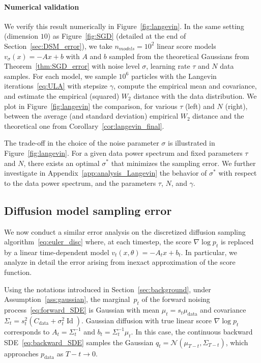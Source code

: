 \documentclass[11pt]{article}
\newcommand{\id}{\operatorname{Id}}
\begin{document}
\paragraph{Numerical validation} We verify this result numerically in Figure~\ref{fig:langevin}. In the same setting (dimension $10$) as Figure~\ref{fig:SGD} (detailed at the end of Section~\ref{sec:DSM_error}), we take $n_{models} = 10^2$ linear score models $v_\sigma(x) = -A x +b$ with $A$ and $b$ sampled from the theoretical Gaussians from Theorem~\ref{thm:SGD_error} with noise level $\sigma$, learning rate $\tau$ and $N$ data samples. For each model, we sample $10^6$ particles with the Langevin iterations~\eqref{eq:ULA} with stepsize $\gamma$, compute the empirical mean and covariance, and estimate the empirical (squared) $W_2$ distance with the data distribution. We plot in Figure~\ref{fig:langevin} the comparison, for various $\tau$ (left) and $N$ (right), between the average (and standard deviation) empirical $W_2$ distance and the theoretical one from Corollary~\ref{cor:langevin_final}. 

The trade-off in the choice of the noise parameter $\sigma$ is illustrated in Figure~\ref{fig:langevin}. For a given data power spectrum and fixed parameters \(\tau\) and \(N\), there exists an optimal \(\sigma^*\) that minimizes the sampling error. We further  investigate in Appendix~\ref{app:analysis_Langevin} the behavior of \(\sigma^*\) with respect to the data power spectrum, and the parameters $\tau$, $N$, and $\gamma$.
  


\subsection{Diffusion model sampling error}
\label{sec:diffusion}

We now conduct a similar error analysis on the discretized diffusion sampling algorithm~\eqref{eq:euler_disc} where, at each timestep, the score $\nabla \log p_{t}$ is replaced by a linear time-dependent model ${v_{t}(x, \theta) = - A_{t}x + b_{t}}$. In particular, we analyze in detail the error arising from inexact approximation of the score function.

Using the notations introduced in Section~\ref{sec:background}, under Assumption~\ref{ass:gaussian}, the marginal~$p_t$ of the forward noising process~\eqref{eq:forward_SDE} is Gaussian with mean $\mu_t = s_t \mu_{\mathrm{data}}$ and covariance $\Sigma_t = s_t^2(C_{\mathrm{data}} + \sigma_t^2\id)$.  Gaussian diffusion with true linear score $\nabla \log p_t$ corresponds to $A_t = \Sigma_t^{-1}$ and $b_t = \Sigma_t^{-1} \mu_t$. In this case, the continuous backward SDE~\eqref{eq:backward_SDE} samples the Gaussian $q_t = \mathcal{N}(\mu_{T-t}, \Sigma_{T-t})$, which approaches $p_\mathrm{data}$ as $T - t \to 0$.
\end{document}
